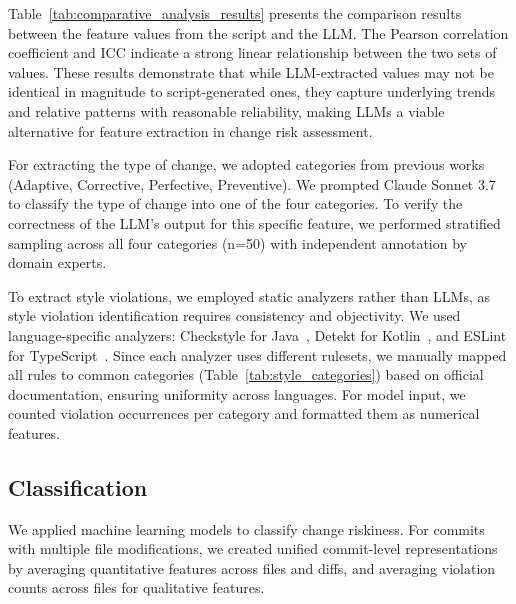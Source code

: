 

Table~\ref{tab:comparative_analysis_results} presents the comparison results between the feature values from the script and the LLM. 
The Pearson correlation coefficient and ICC indicate a strong linear relationship between the two sets of values. These results demonstrate that while LLM-extracted values may not be identical in magnitude to script-generated ones, they capture underlying trends and relative patterns with reasonable reliability, making LLMs a viable alternative for feature extraction in change risk assessment.





For extracting the type of change, we adopted categories from previous works~\cite{LevinYehudai2017} (Adaptive, Corrective, Perfective, Preventive). We prompted Claude Sonnet 3.7 to classify the type of change into one of the four categories. To verify the correctness of the LLM's output for this specific feature, we performed stratified sampling across all four categories (n=50) with independent annotation by domain experts.

To extract style violations, we employed static analyzers rather than LLMs, as style violation identification requires consistency and objectivity. We used language-specific analyzers: Checkstyle for Java~\cite{checkstyleCheckstyle1101}, Detekt for Kotlin~\cite{detektHelloFrom}, and ESLint for TypeScript~\cite{typescripteslintTypescripteslint}. Since each analyzer uses different rulesets, we manually mapped all rules to common categories (Table~\ref{tab:style_categories}) based on official documentation, ensuring uniformity across languages. For model input, we counted violation occurrences per category and formatted them as numerical features.


\subsection{Classification}
\label{subsec:classification}
We applied machine learning models to classify change riskiness. For commits with multiple file modifications, we created unified commit-level representations by averaging quantitative features across files and diffs, and averaging violation counts across files for qualitative features.

